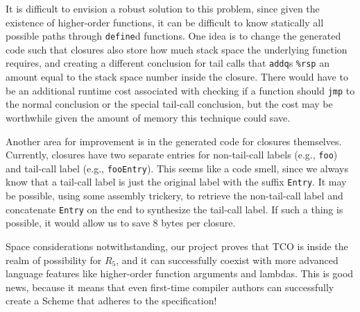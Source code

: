 \documentclass[12pt]{article}
\begin{document}
It is difficult to envision a robust solution to this problem, since given the existence
of higher-order functions, it can be difficult to know statically all possible paths
through \verb+define+d functions. One idea is to change the generated code such that
closures also store how much stack space the underlying function requires, and creating
a different conclusion for tail calls that \verb+addq+s \verb+%rsp+ an amount equal
to the stack space number inside the closure. There would have to be an additional
runtime cost associated with checking if a function should \verb+jmp+ to the normal
conclusion or the special tail-call conclusion, but the cost may be worthwhile
given the amount of memory this technique could save.

Another area for improvement is in the generated code for closures themselves.
Currently, closures have two separate entries for non-tail-call labels (e.g.,
\verb+foo+) and tail-call label (e.g., \verb+fooEntry+). This seems like a code
smell, since we always know that a tail-call label is just the original label with
the suffix \verb+Entry+. It may be possible, using some assembly trickery, to
retrieve the non-tail-call label and concatenate \verb+Entry+ on the end to
synthesize the tail-call label. If such a thing is possible, it would allow us
to save 8 bytes per closure.

Space considerations notwithstanding, our project proves that TCO is inside the
realm of possibility for $R_5$, and it can successfully coexist with more advanced
language features like higher-order function arguments and lambdas. This is good
news, because it means that even first-time compiler authors can successfully
create a Scheme that adheres to the specification!
\end{document}
